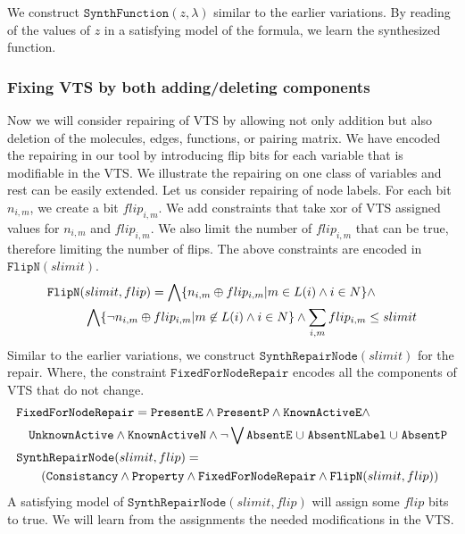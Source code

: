 We construct $\texttt{SynthFunction}(z,\lambda)$ similar to the earlier
variations.
%
By reading of the values of $z$ in a satisfying model of the formula,
we learn the synthesized function.

\subsubsection{Fixing VTS by both adding/deleting components}
%
Now we will consider repairing of VTS by allowing not only addition but also
deletion of the molecules, edges, functions, or pairing matrix.
%
We have encoded the repairing in our tool by introducing flip bits
for each variable that is modifiable in the VTS.
%
We illustrate the repairing on one class of variables and rest can be
easily extended.
%
Let us consider repairing of node labels.
%
For each bit $n_{i,m}$, we create a bit $flip_{i,m}$.
%
We add constraints that take xor of VTS assigned values for  $n_{i,m}$
and $flip_{i,m}$.
%
We also limit the number of $flip_{i,m}$ that can be true, therefore
limiting the number of flips.
%
The above constraints are encoded in $\texttt{FlipN}(slimit)$.
\begin{align*}
&\texttt{FlipN}(slimit,flip) = \bigwedge \{n_{i,m}\oplus flip_{i,m}| m \in L(i) \land i \in N \} \land \\
& \quad \quad \quad
\bigwedge \{ \lnot n_{i,m}\oplus flip_{i,m}| m \not \in L(i) \land i \in N \} \land  \sum\limits_{i,m} flip_{i,m} \leq slimit
\end{align*}
%
Similar to the earlier variations, we construct
$\texttt{SynthRepairNode}(slimit)$ for the repair.
%
Where, the constraint $\texttt{FixedForNodeRepair}$ encodes all the components of VTS that do not change.
\begin{align*}
& \texttt{FixedForNodeRepair} =  \texttt{PresentE} \land  
\texttt{PresentP} \land \texttt{KnownActiveE} 
\land \\
& \quad \texttt{UnknownActive} \land \texttt{KnownActiveN} \land \lnot 
\bigvee \texttt{AbsentE} \;{\cup}\; \texttt{AbsentNLabel} \;{\cup}\;
\texttt{AbsentP}\\
&\texttt{SynthRepairNode}(slimit,flip) = \\
& \quad\quad
(  \texttt{Consistancy}\land \texttt{Property} \land
\texttt{FixedForNodeRepair} \land \texttt{FlipN}(slimit,flip) )
\end{align*}
A satisfying model of $\texttt{SynthRepairNode}(slimit,flip)$ will assign some
$flip$ bits to true.
We will learn from the assignments the needed modifications in the VTS. 

               
